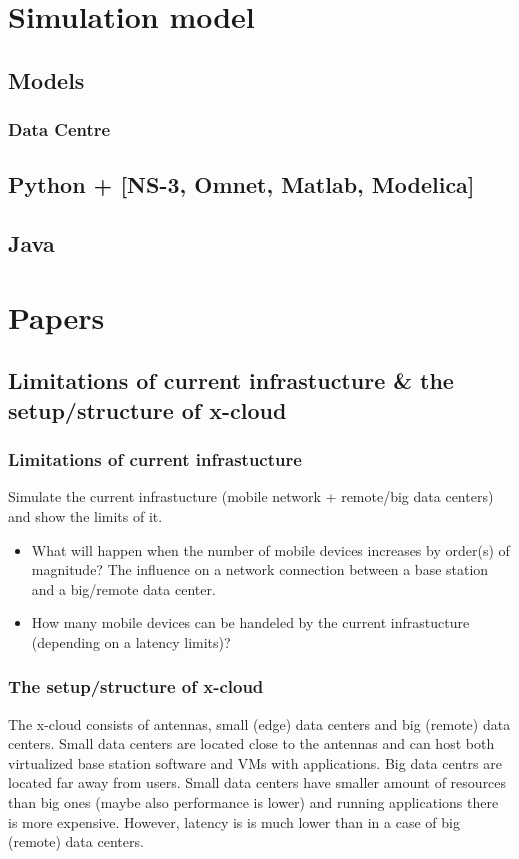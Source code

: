 \documentclass[conference]{IEEEtran}
\newcommand{\xcloud}{x-cloud }
\begin{document}
\section{Simulation model}

\subsection{Models}

\subsubsection{Data Centre}
\cite{5959161}

\subsection{Python + [NS-3, Omnet, Matlab, Modelica]}

\subsection{Java}

\section{Papers}

\subsection{Limitations of current infrastucture \& the setup/structure of \xcloud}
\subsubsection{Limitations of current infrastucture}
Simulate the current infrastucture (mobile network + remote/big data centers) and show the limits of it.
\begin{itemize}
\item What will happen when the number of mobile devices increases by order(s) of magnitude? The influence on a network connection between a base station and a big/remote data center.
\item How many mobile devices can be handeled by the current infrastucture (depending on a latency limits)?
\end{itemize}
\subsubsection{The setup/structure of \xcloud}
The \xcloud consists of antennas, small (edge) data centers and big (remote) data centers.
Small data centers are located close to the antennas and can host both virtualized base station software and VMs with applications.
Big data centrs are located far away from users.
Small data centers have smaller amount of resources than big ones (maybe also performance is lower) and running applications there is more expensive.
However, latency is is much lower than in a case of big (remote) data centers.
\end{document}
